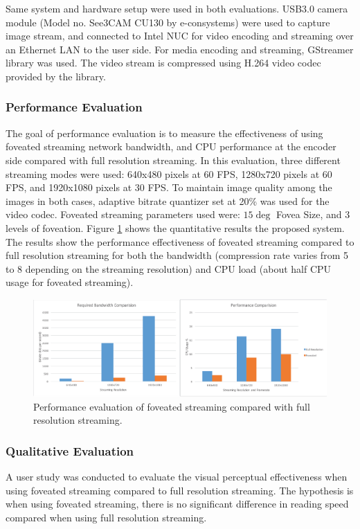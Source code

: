 Same system and hardware setup were used in both evaluations. USB3.0 camera module (Model no. See3CAM CU130 by e-consystems) were used to capture image stream, and connected to Intel NUC for video encoding and streaming over an Ethernet LAN to the user side. For media encoding and streaming, GStreamer library was used. The video stream is compressed using H.264 video codec provided by the library.

\subsubsection{Performance Evaluation}
The goal of performance evaluation is to measure the effectiveness of using foveated streaming network bandwidth, and CPU performance at the encoder side compared with full resolution streaming. In this evaluation, three different streaming modes were used: 640x480 pixels at 60 FPS, 1280x720 pixels at 60 FPS, and 1920x1080 pixels at 30 FPS. To maintain image quality among the images in both cases, adaptive bitrate quantizer set at 20\% was used for the video codec. Foveated streaming parameters used were: $15\deg$ Fovea Size, and 3 levels of foveation.  Figure \ref{fig.PerfEval} shows the quantitative results the proposed system. The results show the performance effectiveness of foveated streaming compared to full resolution streaming for both the bandwidth (compression rate varies from 5 to 8 depending on the streaming resolution) and CPU load (about half CPU usage for foveated streaming). 

\begin{figure} [t!]
\includegraphics[width=1\linewidth]{figures/system/fov-Eval1.pdf}
\centering
  \captionsetup{justification=centering}
\caption{Performance evaluation of foveated streaming compared with full resolution streaming.}
\label{fig.PerfEval}
\end{figure}


\subsubsection{Qualitative Evaluation}
A user study was conducted to evaluate the visual perceptual effectiveness when using foveated streaming compared to full resolution streaming. The hypothesis is when using foveated streaming, there is no significant difference in reading speed compared when using full resolution streaming. 

